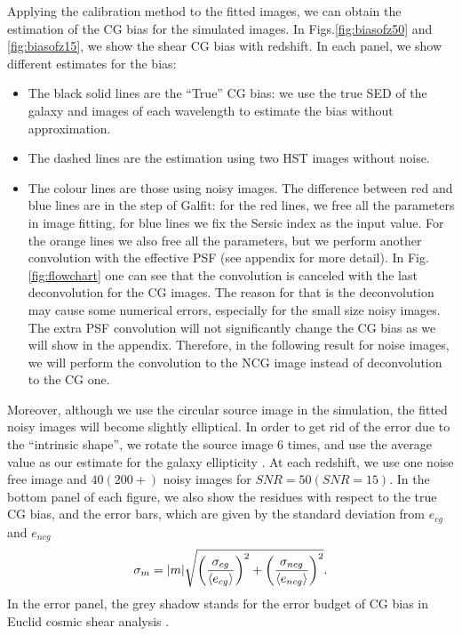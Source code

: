 \documentclass[useAMS,usenatbib]{mn2e}
\newcommand{\be}{\begin{equation}}
\newcommand{\ee}{\end{equation}}
\newcommand{\rund}[1]{\left(#1\right)}
\def\elabel#1{\label{eq:#1}}
\begin{document}
Applying the calibration method to the fitted images, we can obtain
the estimation of the CG bias for the simulated images. In
Figs.\ref{fig:biasofz50} and \ref{fig:biasofz15}, we show the shear CG
bias with redshift. In each panel, we show different estimates for the
bias: 
\begin{itemize}
\item
The black solid lines are the ``True'' CG bias: we use the true
SED of the galaxy and images of each wavelength to estimate the bias
without approximation. 
\item
The dashed lines are the estimation using two
HST images without noise.
\item
The colour lines are those using noisy
images. The difference between red and blue lines are in the step of
Galfit: for the red lines, we free all the parameters in image
fitting, for blue lines we fix the Sersic index as the input
value. For the orange lines we also free all the parameters, but we
perform another convolution with the effective PSF (see appendix for
more detail). In Fig.\ref{fig:flowchart} one can see that the
convolution is canceled with the last deconvolution for the CG images.
The reason for that is the deconvolution may cause some numerical
errors, especially for the small size noisy images. The extra PSF
convolution will not significantly change the CG bias as we will show
in the appendix. Therefore, in the following result for noise images,
we will perform the convolution to the NCG image instead of
deconvolution to the CG one.
\end{itemize}
Moreover, although we use the circular source image in the simulation,
the fitted noisy images will become slightly elliptical. In order to
get rid of the error due to the ``intrinsic shape'', we rotate the
source image $6$ times, and use the average value as our estimate for
the galaxy ellipticity \citep{2007AJ....133.1763N}. At each redshift,
we use one noise free image and $40 (200+)$ noisy images for $SNR=50
(SNR=15)$.  In the bottom panel of each figure, we also show the
residues with respect to the true CG bias, and the error bars, which
are given by the standard deviation from $e_{cg}$ and $e_{ncg}$
%
\be
\sigma_m= |m| \sqrt{\rund{\sigma_{cg} \over \langle e_{cg}\rangle }^2
  + \rund{\sigma_{ncg} \over \langle e_{ncg} \rangle}^2 }.
\elabel{sigmam}
\ee
%
In the error panel, the grey shadow stands for the error budget of CG bias in
Euclid cosmic shear analysis \citep[$\pm
  0.00025$][]{2013MNRAS.431.3103C,2013MNRAS.429..661M}.
\end{document}

